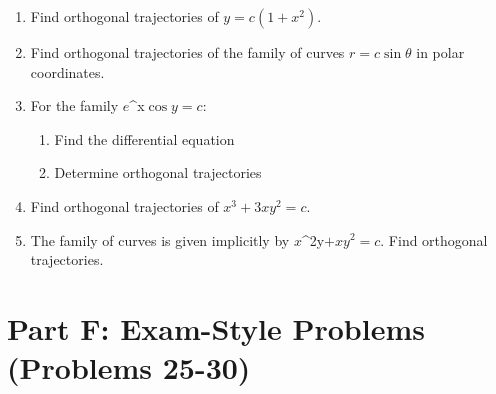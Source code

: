 \documentclass[12pt]{article}
\begin{document}
\begin{enumerate}[start=20]
\item Find orthogonal trajectories of $y = c(1 + x^{2})$.

\item Find orthogonal trajectories of the family of curves $r = c\sin\theta$ in polar coordinates.

\item For the family $e$^{x}$\cos y = c$:
\begin{enumerate}[label=(\alph*)]
    \item Find the differential equation
    \item Determine orthogonal trajectories
\end{enumerate}

\item Find orthogonal trajectories of $x^{3} + 3xy^{2} = c$.

\item The family of curves is given implicitly by $x$^{2y}$ + xy^{2} = c$. Find orthogonal trajectories.
\end{enumerate}

\section*{Part F: Exam-Style Problems (Problems 25-30)}
\end{document}
